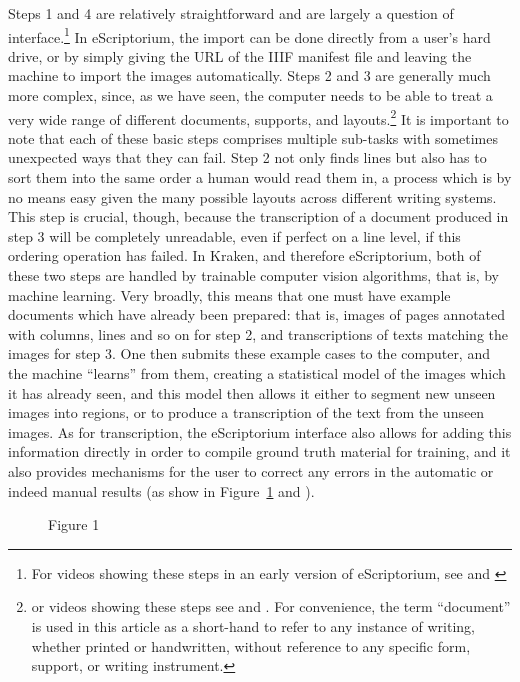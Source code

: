 Steps 1 and 4 are relatively straightforward and are largely a question of
interface.\footnote{For videos showing these steps in an early version of
eScriptorium, see \cite{stokes2020escriptorium} and \cite[n. 1 and
5]{stokes2020videos}} In eScriptorium, the import can be done directly from a
user’s hard drive, or by simply giving the URL of the IIIF manifest file and
leaving the machine to import the images automatically. Steps 2 and 3 are
generally much more complex, since, as we have seen, the computer needs to be
able to treat a very wide range of different documents, supports, and
layouts.\footnote{or videos showing these steps see
\cite{stokes2020escriptorium} and \cite[n. 2-4 and 6]{stokes2020videos}. For
convenience, the term “document” is used in this article as a short-hand to
refer to any instance of writing, whether printed or handwritten, without
reference to any specific form, support, or writing instrument.} It is
important to note that each of these basic steps comprises multiple sub-tasks
with sometimes unexpected ways that they can fail. Step 2 not only finds lines
but also has to sort them into the same order a human would read them in, a
process which is by no means easy given the many possible layouts across
different writing systems. This step is crucial, though, because the
transcription of a document produced in step 3 will be completely unreadable,
even if perfect on a line level, if this ordering operation has failed. In
Kraken, and therefore eScriptorium, both of these two steps are handled by
trainable computer vision algorithms, that is, by machine learning. Very
broadly, this means that one must have example documents which have already
been prepared: that is, images of pages annotated with columns, lines and so on
for step 2, and transcriptions of texts matching the images for step 3. One
then submits these example cases to the computer, and the machine “learns” from
them, creating a statistical model of the images which it has already seen, and
this model then allows it either to segment new unseen images into regions, or
to produce a transcription of the text from the unseen images. As for
transcription, the eScriptorium interface also allows for adding this
information directly in order to compile ground truth material for training,
and it also provides mechanisms for the user to correct any errors in the
automatic or indeed manual results (as show in Figure~\ref{fig:fig1} and \cite[n.
3]{stokes2020videos}).

\begin{figure}[h]
	\caption{Figure 1}
	\label{fig:fig1}
\end{figure}

